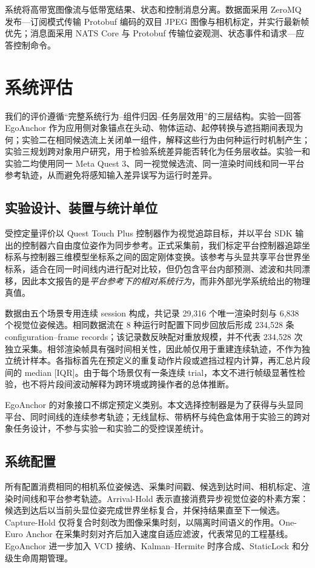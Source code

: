 \documentclass[9pt,twocolumn,letterpaper]{extarticle}
\begin{document}
系统将高带宽图像流与低带宽结果、状态和控制消息分离。数据面采用 ZeroMQ 发布---订阅模式传输 Protobuf 编码的双目 JPEG 图像与相机标定，并实行最新帧优先；消息面采用 NATS Core 与 Protobuf 传输位姿观测、状态事件和请求---应答控制命令。

\section{系统评估}\label{sec:eval}

我们的评价遵循“完整系统行为--组件归因--任务层效用”的三层结构。实验一回答 EgoAnchor 作为应用侧对象锚点在头动、物体运动、起停转换与遮挡期间表现为何；实验二在相同候选流上关闭单一组件，解释这些行为由何种运行时机制产生；实验三规划跨对象用户研究，用于检验系统差异能否转化为任务层收益。实验一和实验二均使用同一 Meta Quest 3、同一视觉候选流、同一渲染时间线和同一平台参考轨迹，从而避免将感知输入差异误写为运行时差异。

\subsection{实验设计、装置与统计单位}

受控定量评价以 Quest Touch Plus 控制器作为视觉追踪目标，并以平台 SDK 输出的控制器六自由度位姿作为同步参考。正式采集前，我们标定平台控制器追踪坐标系与控制器三维模型坐标系之间的固定刚体变换。该参考与头显共享平台世界坐标系，适合在同一时间线内进行配对比较，但仍包含平台内部预测、滤波和共同漂移，因此本文报告的是\emph{平台参考下的相对系统行为}，而非外部光学系统给出的物理真值。

数据由五个场景专用连续 session 构成，共记录 29,316 个唯一渲染时刻与 6,838 个视觉位姿候选。相同数据流在 8 种运行时配置下同步回放后形成 234,528 条 configuration--frame records；该记录数反映配对重放规模，并不代表 234,528 次独立采集。相邻渲染帧具有强时间相关性，因此帧仅用于重建连续轨迹，不作为独立统计样本。各指标首先在预定义的重复动作片段或遮挡过程内计算，再汇总片段间的 median [IQR]。由于每个场景仅有一条连续 trial，本文不进行帧级显著性检验，也不将片段间波动解释为跨环境或跨操作者的总体推断。

EgoAnchor 的对象接口不绑定预定义类别。本文选择控制器是为了获得与头显同平台、同时间线的连续参考轨迹；无线鼠标、带柄杯与纯色盒体用于实验三的跨对象任务设计，不参与实验一和实验二的受控误差统计。

\subsection{系统配置}

所有配置消费相同的相机系位姿候选、采集时间戳、候选到达时间、相机标定、渲染时间线和平台参考轨迹。Arrival-Hold 表示直接消费异步视觉位姿的朴素方案：候选到达后以当前头显位姿完成世界坐标复合，并保持结果直至下一候选。Capture-Hold 仅将复合时刻改为图像采集时刻，以隔离时间语义的作用。One-Euro Anchor 在采集时刻对齐后加入速度自适应滤波，代表常见的工程基线。EgoAnchor 进一步加入 VCD 接纳、Kalman--Hermite 时序合成、StaticLock 和分级生命周期管理。
\end{document}
